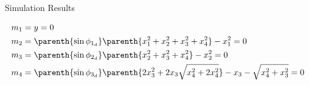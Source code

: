 \documentclass[final, usenames, dvipsnames]{beamer}
\newlength{\twocolwidth}
\begin{document}
\begin{frame}[t]
\begin{columns}[T]
\begin{column}{\twocolwidth}
\begin{block}{Simulation Results}
\begin{minipage}[t]{0.5\columnwidth}
        \begin{align*}\label{eq:terminal_constraints}
            \begin{split}
                m_1 &= y = 0  \\
                m_2 &= \parenth{\sin \phi_{1_{d}}} \parenth{ x_1^2 + x_2^2 + x_3^2 + x_4^2} - x_1^2 = 0 \\
                m_3 &= \parenth{\sin \phi_{2_{d}}} \parenth{ x_2^2 + x_3^2 + x_4^2} - x_2^2 = 0\\
                m_4 &= \parenth{\sin \phi_{3_{d}}} \parenth{ 2 x_3^2 + 2 x_3 \sqrt{x_4^2 + 2 x_4^2}} - x_3 - \sqrt{x_4^2 + x_3^2} = 0 
            \end{split}
        \end{align*}
    \end{minipage}


\end{block}
\end{column}
\end{columns}
\end{frame}
\end{document}
